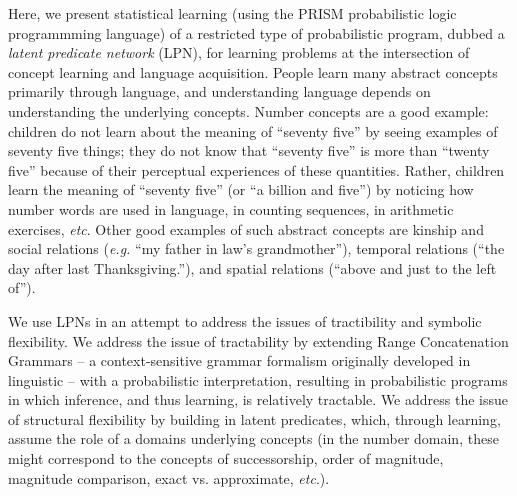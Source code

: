 \documentclass{article} %
\begin{document}
Here, we present statistical learning (using the PRISM probabilistic
logic programmming language) of a restricted type of probabilistic
program, dubbed a \emph{latent predicate network} (LPN), for learning
problems at the intersection of concept learning and language
acquisition. People learn many abstract concepts primarily through
language, and understanding language depends on understanding the
underlying concepts. Number concepts are a good example: children do
not learn about the meaning of ``seventy five'' by seeing examples of
seventy five things; they do not know that ``seventy five'' is more
than ``twenty five'' because of their perceptual experiences of these
quantities. Rather, children learn the meaning of ``seventy five'' (or
``a billion and five'') by noticing how number words are used in
language, in counting sequences, in arithmetic exercises, {\it
  etc}. Other good examples of such abstract concepts are kinship and
social relations ({\it e.g.} ``my father in law's grandmother''),
temporal relations (``the day after last Thanksgiving.''), and spatial
relations (``above and just to the left of'').

We use LPNs in an attempt to address the issues of tractibility and
symbolic flexibility. We address the issue of tractability by
extending Range Concatenation Grammars -- a context-sensitive grammar
formalism originally developed in linguistic -- with a probabilistic
interpretation, resulting in probabilistic programs in which
inference, and thus learning, is relatively tractable. We address the
issue of structural flexibility by building in latent predicates,
which, through learning, assume the role of a domains underlying concepts (in the
number domain, these might correspond to the concepts of
successorship, order of magnitude, magnitude comparison, exact
vs. approximate, {\it etc}.).



\end{document}
